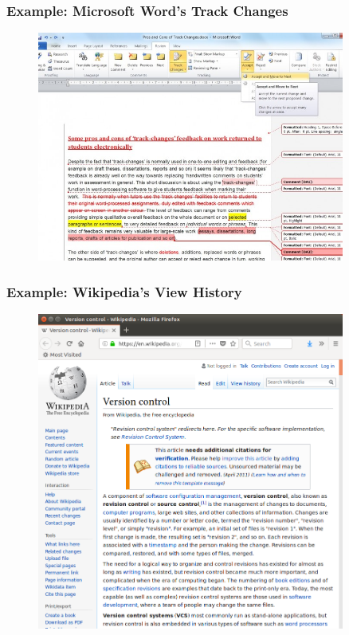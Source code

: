 \documentclass{beamer}
\begin{document}
\begin{frame}
   \frametitle{Example: Microsoft Word's Track Changes}
   \begin{figure}[htbp]
      \includegraphics[width=0.9\textwidth]{images/ms-word-track-changes.jpg}
   \end{figure}
\end{frame}

\begin{frame}
   \frametitle{Example: Wikipedia's View History}
   \begin{figure}[htbp]
      \includegraphics[width=0.9\textwidth]{images/version-control-wikipedia.png}
   \end{figure}
\end{frame}
\end{document}
